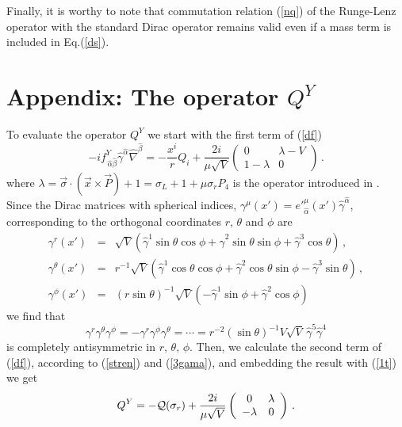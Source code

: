 \documentclass[a4paper,12pt]{article}
\begin{document}
Finally, it is worthy to note that commutation relation (\ref{nq}) of 
the Runge-Lenz operator with the standard Dirac operator remains valid 
even if a mass term is included in Eq.(\ref{ds}).


\setcounter{equation}{0} \renewcommand{\theequation} 
{A.\arabic{equation}}

\section*{Appendix: The operator $Q^Y$}

To evaluate the operator $Q^Y$ we start with the first term of (\ref{df})
\begin{equation}\label{1t}
-if^Y_{\,\hat\alpha\hat\beta}\hat\gamma^{\hat\alpha}\hat\nabla
^{\hat\beta}=-\frac{x^i}{r} Q_{i}+\frac{2i}{\mu\sqrt{V}}
\left(
\begin{array}{cc}
0&\lambda-V\\
1-\lambda&0
\end{array}
\right)\,.
\end{equation}
where $\lambda =\vec{\sigma}\cdot(\vec{x}\times\vec{P})+1=\sigma_{L}+1+
\mu\sigma_{r}P_{4}$ is the operator introduced in \cite{JMP}.
Since the Dirac matrices with spherical indices,   
$\gamma^{\mu}(x')={e'}^{\mu}_{\hat\alpha}(x')\hat\gamma^{\hat\alpha}$, 
corresponding to the orthogonal coordinates $r,\,\theta$ and $\phi$ are
\begin{eqnarray}
\gamma^{r}(x')&=&\sqrt{V}(\hat\gamma^{1}\sin\theta\cos\phi+
\hat\gamma^{2}\sin\theta\sin\phi +\hat\gamma^{3}\cos\theta)\,,\\            
\gamma^{\theta}(x')&=&r^{-1}\sqrt{V}(\hat\gamma^{1}\cos\theta\cos\phi+
\hat\gamma^{2}\cos\theta\sin\phi -\hat\gamma^{3}\sin\theta)\,,\\            
\gamma^{\phi}(x')&=&(r\sin\theta)^{-1}\sqrt{V}(-\hat\gamma^{1}\sin\phi+
\hat\gamma^{2}\cos\phi)
\end{eqnarray}
we find that 
\begin{equation}\label{3gama}
\gamma^{r}\gamma^{\theta}\gamma^{\phi}=
-\gamma^{r}\gamma^{\phi}\gamma^{\theta}=\cdots=
r^{-2}(\sin\theta)^{-1}V\sqrt{V}\,\hat\gamma^{5}\hat\gamma^{4}
\end{equation}
is completely antisymmetric in $r,\,\theta,\,\phi$. Then, we calculate the 
second term of (\ref{df}), according to (\ref{stren}) and (\ref{3gama}), 
and embedding the result with (\ref{1t}) we get
\begin{equation}\label{dy1}
Q^Y=-{\cal Q}(\sigma_r)+\frac{2i}{\mu\sqrt{V}}
\left(
\begin{array}{cc}
0&\lambda\\
-\lambda&0
\end{array}
\right)\,.
\end{equation}
\end{document}
